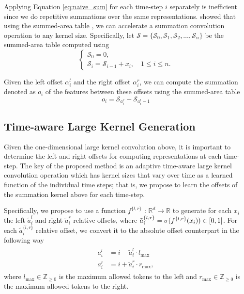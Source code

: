 \documentclass{article}
\begin{document}
Applying Equation \ref{eq:naive_sum} for each time-step $i$ separately is inefficient since we do repetitive summations over the same representations. \citet{zhang2019accelerating} showed that using the summed-area table \cite{crow1984summed}, we can accelerate a summation convolution operation to any kernel size. Specifically, let $\mathcal{S} = \{\mathcal{S}_{0}, \mathcal{S}_{1}, \mathcal{S}_{2}, \ldots, \mathcal{S}_{n}\}$ be the summed-area table computed using
\begin{equation}
    \begin{cases} \mathcal{S}_{0} = 0, \\
    \mathcal{S}_{i} = \mathcal{S}_{i-1} + x_{i}, \quad 1\leq i\leq n. \end{cases}
\label{eq:sum_table}
\end{equation}

Given the left offset $\alpha_{i}^l$ and the right offset $\alpha_{i}^r$, we can compute the summation denoted as $o_i$ of the features between these offsets using the summed-area table
\begin{equation}
    o_{i} = \mathcal{S}_{a_{i}^{r}} - \mathcal{S}_{a_{i}^l-1}
    \label{eq:output}
\end{equation}
 

\subsection{Time-aware Large Kernel Generation}
\label{sec:talk}
Given the one-dimensional large kernel convolution above, it is important to determine the left and right offsets for computing representations at each time-step. The key of the proposed method is an adaptive time-aware large kernel convolution operation which has kernel sizes that vary over time as a learned function of the individual time steps; that is, we propose to learn the offsets of the summation kernel above for each time-step.

Specifically, we propose to use
a function $f^{\{l,r\}}$ : $\mathbb{R}^d \rightarrow \mathbb{R}$ 
to
generate for each $x_i$ the left $\tilde{a}_i^l$ and right $\tilde{a}_i^r$ relative offsets, 
where $\tilde{a}_i^{\{l,r\}} = \sigma(f^{\{l,r\}}(x_i)) \in [0,1]$. 
For each $\tilde{a}_i^{\{l,r\}}$ relative offset, we convert it to the absolute offset counterpart
in the following way
\begin{align}
\begin{split}
    a_{i}^l &= i - \tilde{a}_{i}^l \cdot l_\text{max} \\
    a_{i}^r &= i + \tilde{a}_{i}^r \cdot r_\text{max},
\end{split}
\label{eq:abs_off}
\end{align}
where $l_\text{max} \in \mathbb{Z}_{\geq 0}$ is the maximum allowed tokens to the left and $r_\text{max} \in \mathbb{Z}_{\geq 0}$ is the maximum allowed tokens to the right.
\end{document}
